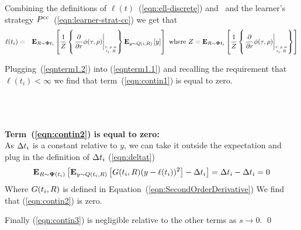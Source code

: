 \documentclass{article}[12pt]
\begin{document}
Combining the definitions of $\ell(t)$~(\ref{eqn:ell-discrete}) and~
and the learner's strategy
$P^{cc}$~(\ref{eqn:learner-strat-cc}) we get that
\begin{eqnarray}
\ell(t_i) &=& \E{\R \sim \state{t_i}}{\frac{1}{Z}
              \at{\frac{\partial}{\partial r}}
              \E{y \sim \adversM(i,\R)}{y}} \mbox{ where }
              Z=\E{\R \sim \state{t_i}}{\frac{1}{Z}
              \at{\frac{\partial}{\partial r}}}
              \label{eqnterm1.2}
\end{eqnarray}

Plugging~(\ref{eqnterm1.2}) into (\ref{eqnterm1.1}) and recalling the
requirement that $\ell(t_i)<\infty$ we find that
term~(\ref{eqn:contin1}) is equal to zero.


~\\~\\~\\
{\bf Term~(\ref{eqn:contin2}) is equal to zero:}\\
As $\Delta t_i$ is a constant relative to $y$, we can take it
outside the expectation and plug in the definition of $\Delta t_i$ (\ref{eqn:deltat})
\begin{equation} \label{eqn:term2.1}
  {\bf E}_{R \sim {\bf \Psi}(t_i)}\left[ {\bf E}_{y \sim
      Q(t_i,R)}\left[ G(t_i,R)(y-\ell(t_i))^2 \right] - \Delta t_i \right]=
  \Delta t_i - \Delta t_i =0
\end{equation}
Where $G(t_i,R)$ is defined in Equation~(\ref{eqn:SecondOrderDerivative})
We find that (\ref{eqn:contin2}) is zero.

Finally (\ref{eqn:contin3}) is negligible relative to the other terms
as $s \to 0$.
\qed 
\end{document}
